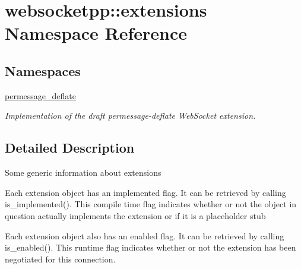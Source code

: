 \hypertarget{namespacewebsocketpp_1_1extensions}{}\section{websocketpp\+:\+:extensions Namespace Reference}
\label{namespacewebsocketpp_1_1extensions}
\subsection*{Namespaces}
\begin{DoxyCompactItemize}
\item 
 \hyperlink{namespacewebsocketpp_1_1extensions_1_1permessage__deflate}{permessage\+\_\+deflate}
\begin{DoxyCompactList}\small\item\em Implementation of the draft permessage-\/deflate Web\+Socket extension. \end{DoxyCompactList}\end{DoxyCompactItemize}


\subsection{Detailed Description}
Some generic information about extensions

Each extension object has an implemented flag. It can be retrieved by calling is\+\_\+implemented(). This compile time flag indicates whether or not the object in question actually implements the extension or if it is a placeholder stub

Each extension object also has an enabled flag. It can be retrieved by calling is\+\_\+enabled(). This runtime flag indicates whether or not the extension has been negotiated for this connection. 
